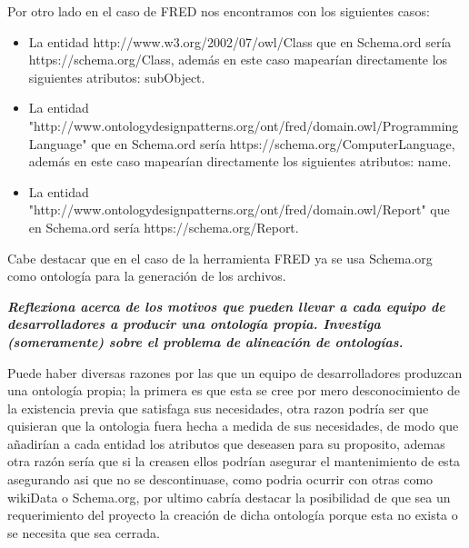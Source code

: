 \documentclass[spanish]{llncs}   %
\begin{document}
Por otro lado en el caso de FRED nos encontramos con los siguientes casos:
\begin{itemize}
    \item La entidad http://www.w3.org/2002/07/owl/Class que en Schema.ord sería https://schema.org/Class, además en 
    este caso mapearían directamente los siguientes atributos: subObject.
    \item La entidad "http://www.ontologydesignpatterns.org/ont/fred/domain.owl/ProgrammingLanguage" que en Schema.ord sería https://schema.org/ComputerLanguage, además en 
    este caso mapearían directamente los siguientes atributos: name.
    \item La entidad "http://www.ontologydesignpatterns.org/ont/fred/domain.owl/Report" que en Schema.ord sería https://schema.org/Report.
\end{itemize}
Cabe destacar que en el caso de la herramienta FRED ya se usa Schema.org como ontología para la generación de los archivos.

\textbf{\textit{Reflexiona acerca de los motivos que pueden llevar a cada equipo de desarrolladores a producir una ontología propia. 
Investiga (someramente) sobre el problema de alineación de ontologías.}}

Puede haber diversas razones por las que un equipo de desarrolladores produzcan una ontología propia; la primera es que esta se cree por 
mero desconocimiento de la existencia previa que satisfaga sus necesidades, otra razon podría ser que quisieran que la ontologia fuera hecha 
a medida de sus necesidades, de modo que añadirían a cada entidad los atributos que deseasen para su proposito, ademas otra razón sería que 
si la creasen ellos podrían asegurar el mantenimiento de esta asegurando asi que no se descontinuase, como podria ocurrir con otras como wikiData 
o Schema.org, por ultimo cabría destacar la posibilidad de que sea un requerimiento del proyecto la creación de dicha ontología porque esta no exista 
o se necesita que sea cerrada.
\end{document}
